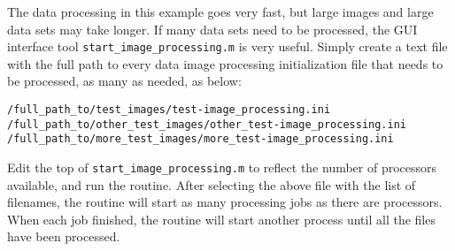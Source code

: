 The data processing in this example goes very fast, but large images and large data sets may take longer.  If many data sets need to be processed, the GUI interface tool \texttt{start\allowbreak\_image\allowbreak\_processing.m} is very useful.  Simply create a text file with the full path to every data image processing initialization file that needs to be processed, as many as needed, as below:

\begin{verbatim}
/full_path_to/test_images/test-image_processing.ini
/full_path_to/other_test_images/other_test-image_processing.ini
/full_path_to/more_test_images/more_test-image_processing.ini
\end{verbatim}

Edit the top of \texttt{start\allowbreak\_image\allowbreak\_processing.m} to reflect the number of processors available, and run the routine.  After selecting the above file with the list of filenames, the routine will start as many processing jobs as there are processors.  When each job finished, the routine will start another process until all the files have been processed.
 






